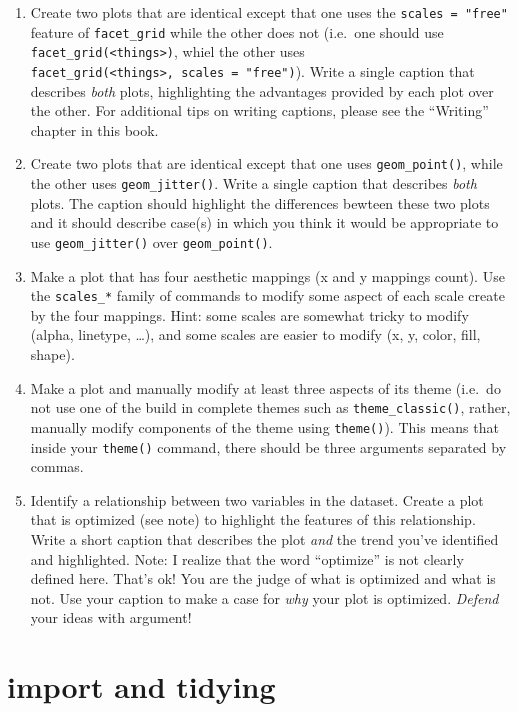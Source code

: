 \documentclass[
]{krantz}
\begin{document}
\begin{enumerate}
\def\labelenumi{\arabic{enumi}.}
\item
  Create two plots that are identical except that one uses the \texttt{scales\ =\ "free"} feature of \texttt{facet\_grid} while the other does not (i.e.~one should use \texttt{facet\_grid(\textless{}things\textgreater{})}, whiel the other uses \texttt{facet\_grid(\textless{}things\textgreater{},\ scales\ =\ "free")}). Write a single caption that describes \emph{both} plots, highlighting the advantages provided by each plot over the other. For additional tips on writing captions, please see the ``Writing'' chapter in this book.
\item
  Create two plots that are identical except that one uses \texttt{geom\_point()}, while the other uses \texttt{geom\_jitter()}. Write a single caption that describes \emph{both} plots. The caption should highlight the differences bewteen these two plots and it should describe case(s) in which you think it would be appropriate to use \texttt{geom\_jitter()} over \texttt{geom\_point()}.
\item
  Make a plot that has four aesthetic mappings (x and y mappings count). Use the \texttt{scales\_*} family of commands to modify some aspect of each scale create by the four mappings. Hint: some scales are somewhat tricky to modify (alpha, linetype, \ldots), and some scales are easier to modify (x, y, color, fill, shape).
\item
  Make a plot and manually modify at least three aspects of its theme (i.e.~do not use one of the build in complete themes such as \texttt{theme\_classic()}, rather, manually modify components of the theme using \texttt{theme()}). This means that inside your \texttt{theme()} command, there should be three arguments separated by commas.
\item
  Identify a relationship between two variables in the dataset. Create a plot that is optimized (see note) to highlight the features of this relationship. Write a short caption that describes the plot \emph{and} the trend you've identified and highlighted. Note: I realize that the word ``optimize'' is not clearly defined here. That's ok! You are the judge of what is optimized and what is not. Use your caption to make a case for \emph{why} your plot is optimized. \emph{Defend} your ideas with argument!
\end{enumerate}

\hypertarget{import-and-tidying}{%
\section{import and tidying}\label{import-and-tidying}}
\end{document}
